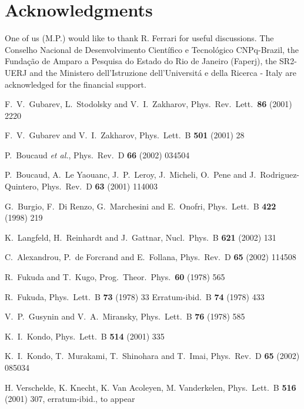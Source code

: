 \documentclass[a4paper,12pt]{article}
\begin{document}
\section*{Acknowledgments}
One of us (M.P.) would like to thank R. Ferrari for useful
discussions. The Conselho Nacional de Desenvolvimento
Cient\'{i}fico e Tecnol\'{o}gico CNPq-Brazil, the
Funda{\c{c}}{\~{a}}o de Amparo a Pesquisa do Estado do Rio de
Janeiro (Faperj), the SR2-UERJ and the Ministero dell'Istruzione
dell'Universit\'a e della Ricerca - Italy are acknowledged for the
financial support.

\begin{thebibliography}{99}
  F.~V.~Gubarev, L.~Stodolsky and V.~I.~Zakharov,
Phys.\ Rev.\ Lett.\ \textbf{86} (2001) 2220

  F.~V.~Gubarev and V.~I.~Zakharov, Phys.\ Lett.\ B
\textbf{501} (2001) 28

  P.~Boucaud \textit{et al.}, Phys.\ Rev.\ D \textbf{%
66} (2002) 034504

  P.~Boucaud, A.~Le Yaouanc, J.~P.~Leroy,
J.~Micheli, O.~Pene and J.~Rodriguez-Quintero, Phys.\ Rev.\ D \textbf{63}
(2001) 114003

  G.~Burgio, F.~Di Renzo, G.~Marchesini and
E.~Onofri, Phys.\ Lett.\ B \textbf{422} (1998) 219

  K.~Langfeld, H.~Reinhardt and J.~Gattnar, Nucl.\
Phys.\ B \textbf{621} (2002) 131

  C.~Alexandrou, P.~de Forcrand and E.~Follana,
Phys.\ Rev.\ D \textbf{65} (2002) 114508

  R.~Fukuda and T.~Kugo, Prog.\ Theor.\ Phys.\
\textbf{60} (1978) 565

  R.~Fukuda, Phys.\ Lett.\ B \textbf{73} (1978) 33
Erratum-ibid.\ B \textbf{74} (1978) 433

V.~P.~Gusynin and V.~A.~Miransky, Phys.\ Lett.\ B {\bf 76} (1978)
585

  K.~I.~Kondo, Phys.\ Lett.\ B \textbf{514} (2001) 335

\bibitem{kmsi}  K.~I.~Kondo, T.~Murakami, T.~Shinohara and T.~Imai, Phys.\
Rev.\ D \textbf{65} (2002) 085034

\bibitem{v1}  H. Verschelde, K. Knecht, K. Van Acoleyen, M. Vanderkelen,
Phys.\ Lett.\ B \textbf{516} (2001) 307, erratum-ibid., to appear


\end{thebibliography}
\end{document}
